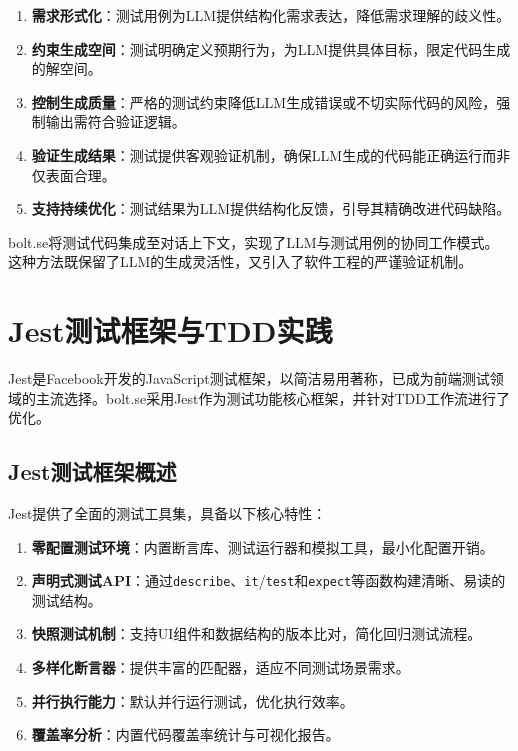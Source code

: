 \begin{enumerate}
  \item \textbf{需求形式化}：测试用例为LLM提供结构化需求表达，降低需求理解的歧义性。
  
  \item \textbf{约束生成空间}：测试明确定义预期行为，为LLM提供具体目标，限定代码生成的解空间。
  
  \item \textbf{控制生成质量}：严格的测试约束降低LLM生成错误或不切实际代码的风险，强制输出需符合验证逻辑。
  
  \item \textbf{验证生成结果}：测试提供客观验证机制，确保LLM生成的代码能正确运行而非仅表面合理。
  
  \item \textbf{支持持续优化}：测试结果为LLM提供结构化反馈，引导其精确改进代码缺陷。
\end{enumerate}

bolt.se将测试代码集成至对话上下文，实现了LLM与测试用例的协同工作模式。这种方法既保留了LLM的生成灵活性，又引入了软件工程的严谨验证机制。

\section{Jest测试框架与TDD实践}

Jest是Facebook开发的JavaScript测试框架，以简洁易用著称，已成为前端测试领域的主流选择\cite{Jest2023}。bolt.se采用Jest作为测试功能核心框架，并针对TDD工作流进行了优化。

\subsection{Jest测试框架概述}

Jest提供了全面的测试工具集，具备以下核心特性：

\begin{enumerate}
  \item \textbf{零配置测试环境}：内置断言库、测试运行器和模拟工具，最小化配置开销。
  
  \item \textbf{声明式测试API}：通过\texttt{describe}、\texttt{it}/\texttt{test}和\texttt{expect}等函数构建清晰、易读的测试结构。
  
  \item \textbf{快照测试机制}：支持UI组件和数据结构的版本比对，简化回归测试流程。
  
  \item \textbf{多样化断言器}：提供丰富的匹配器，适应不同测试场景需求。
  
  \item \textbf{并行执行能力}：默认并行运行测试，优化执行效率。
  
  \item \textbf{覆盖率分析}：内置代码覆盖率统计与可视化报告。
\end{enumerate}

